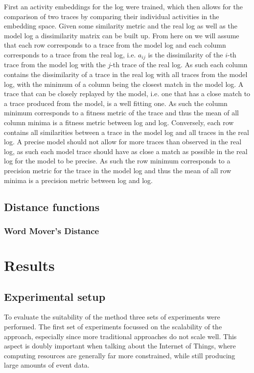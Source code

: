 \documentclass[runningheads]{template/llncs}
\begin{document}
First an activity embeddings for the log were trained, which then allows for the comparison of two traces by comparing their individual activities in the embedding space.
Given some similarity metric and the real log as well as the model log a dissimilarity matrix can be built up.
From here on we will assume that each row corresponds to a trace from the model log and each column corresponds to a trace from the real log, i.e. $a_{ij}$ is the dissimilarity of the $i$-th trace from the model log with the $j$-th trace of the real log.
As such each column contains the dissimilarity of a trace in the real log with all traces from the model log, with the minimum of a column being the closest match in the model log.
A trace that can be closely replayed by the model, i.e. one that has a close match to a trace produced from the model, is a well fitting one.
As such the column minimum corresponds to a fitness metric of the trace and thus the mean of all column minima is a fitness metric between log and log.
Conversely, each row contains all similarities between a trace in the model log and all traces in the real log.
A precise model should not allow for more traces than observed in the real log, as such each model trace should have as close a match as possible in the real log for the model to be precise.
As such the row minimum corresponds to a precision metric for the trace in the model log and thus the mean of all row minima is a precision metric between log and log.

\subsection{Distance functions}
\subsubsection{Word Mover's Distance}

\section{Results}

\subsection{Experimental setup}

To evaluate the suitability of the method three sets of experiments were performed. 
The first set of experiments focussed on the scalability of the approach, especially since more traditional approaches do not scale well. This aspect is doubly important when talking about the Internet of Things, where computing resources are generally far more constrained, while still producing large amounts of event data.
\end{document}
